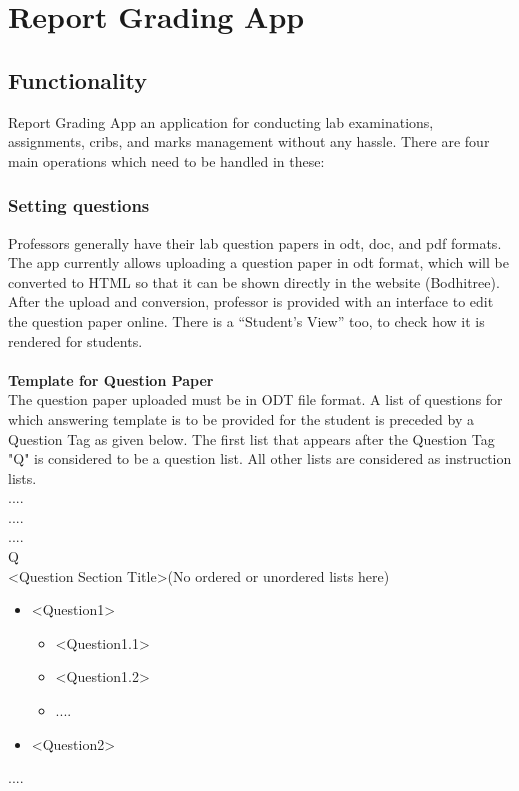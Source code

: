 \section{Report Grading App}
\subsection{Functionality}
Report Grading App an application for conducting lab examinations, assignments, cribs, and marks management without any hassle. There are four main operations which need to be handled in these:
\subsubsection{Setting questions}
Professors generally have their lab question papers in odt, doc, and pdf formats. The app currently allows uploading a question paper in odt format, which will be converted to HTML so that it can be shown directly in the website (Bodhitree). After the upload and conversion, professor is provided with an interface to edit the question paper online. There is a ``Student's View'' too, to check how it is rendered for students.\\
\\
\textbf{Template for Question Paper}\\
The question paper uploaded must be in ODT file format. A list of questions for which answering template is to be provided for the student is preceded
by a Question Tag as given below. The first list that appears after the Question Tag "Q" is
considered to be a question list. All other lists are considered as instruction lists.\\
....\\
....\\
....\\
Q\\
\textless Question Section Title\textgreater (No ordered or unordered lists here)\\
\begin{itemize}
	\item \textless Question1\textgreater
	\begin{itemize}
		\item \textless Question1.1\textgreater
		\item \textless Question1.2\textgreater
		\item ....
	\end{itemize}
	\item \textless Question2\textgreater
\end{itemize}
....


